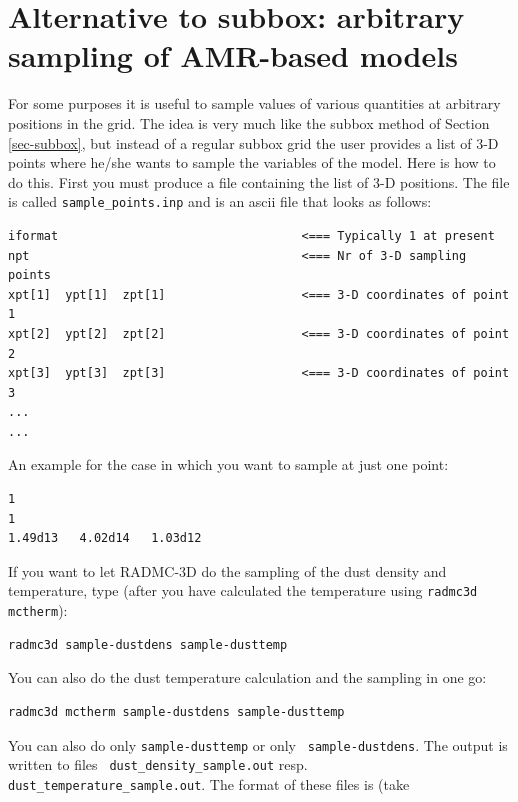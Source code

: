 \documentclass{report}
\newenvironment{asciibox}%
  {\begin{list}{}{%
    \setlength{\topsep}{0.5em}%
    \setlength{\parskip}{0em}%
    \setlength{\parsep}{0em}%
    \setlength{\itemsep}{0em}%
    \setlength{\rightmargin}{0em}%
    \setlength{\leftmargin}{3.0em}%
    \setlength{\labelsep}{1em}%
    \setlength{\labelwidth}{2em}%
  }\normalfont\footnotesize\item}
  {\end{list}}
\begin{document}
\section{Alternative to subbox: arbitrary sampling of AMR-based models}
\label{sec-sampling}
%
For some purposes it is useful to sample values of various quantities at
arbitrary positions in the grid. The idea is very much like the subbox
method of Section \ref{sec-subbox}, but instead of a regular subbox grid
the user provides a list of 3-D points where he/she wants to sample the
variables of the model. Here is how to do this. First you must produce
a file containing the list of 3-D positions. The file is called
{\small\tt sample\_points.inp} and is an ascii file that looks as
follows:
\begin{asciibox}\begin{verbatim}
iformat                                  <=== Typically 1 at present
npt                                      <=== Nr of 3-D sampling points
xpt[1]  ypt[1]  zpt[1]                   <=== 3-D coordinates of point 1
xpt[2]  ypt[2]  zpt[2]                   <=== 3-D coordinates of point 2
xpt[3]  ypt[3]  zpt[3]                   <=== 3-D coordinates of point 3
...
...
\end{verbatim}\end{asciibox}
An example for the case in which you want to sample at just one point:
\begin{asciibox}\begin{verbatim}
1
1
1.49d13   4.02d14   1.03d12
\end{verbatim}\end{asciibox}
If you want to let RADMC-3D do the sampling of the dust density and
temperature, type (after you have calculated the temperature using
{\small\tt radmc3d mctherm}):
\begin{asciibox}\begin{verbatim}
radmc3d sample-dustdens sample-dusttemp
\end{verbatim}\end{asciibox}
You can also do the dust temperature calculation and the sampling in one
go:
\begin{asciibox}\begin{verbatim}
radmc3d mctherm sample-dustdens sample-dusttemp
\end{verbatim}\end{asciibox}
You can also do only {\small\tt sample-dusttemp} or only {\small\tt
  sample-dustdens}. The output is written to files {\small\tt
  dust\_density\_sample.out} resp.\ {\small\tt
  dust\_temperature\_sample.out}. The format of these files is (take
\end{document}
